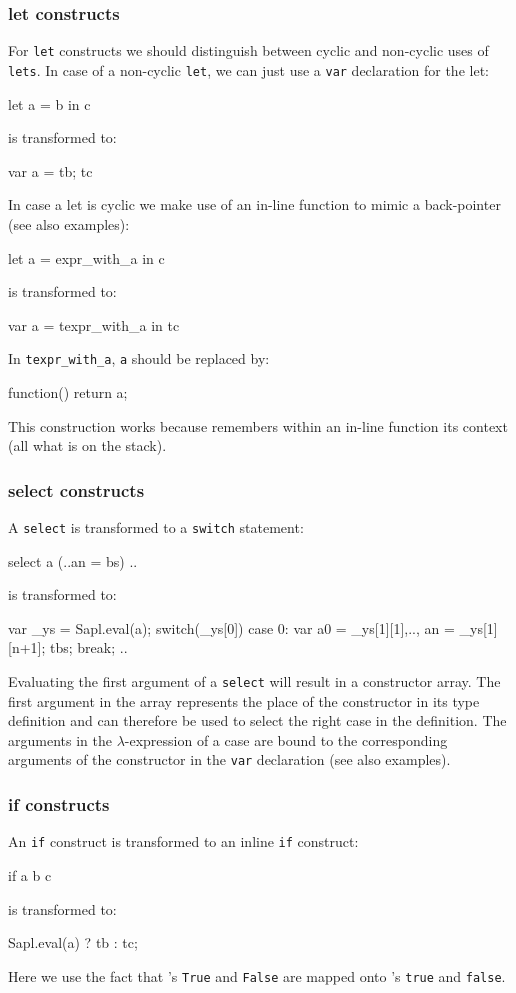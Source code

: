 \subsubsection{\textsf{let} constructs} 
For \texttt{let} constructs we should distinguish between cyclic and non-cyclic uses of \texttt{lets}.
In case of a non-cyclic \texttt{let}, we can just use a \texttt{var} declaration for the let:
\begin{CleanCode}
let a = b in c
\end{CleanCode}
is transformed to:
\begin{CleanCode}
var a = tb; tc
\end{CleanCode}
In case a let is cyclic we make use of an in-line \JS function to mimic a back-pointer (see also examples):
\begin{CleanCode}
let a = expr_with_a in c
\end{CleanCode}
is transformed to:
\begin{CleanCode}
var a = texpr_with_a in tc
\end{CleanCode}
In \texttt{texpr\_with\_a}, \texttt{a} should be replaced by: 
\begin{CleanCode}
function() {return a;}
\end{CleanCode}
This construction works because \JS remembers within an in-line function its context (all what is on the stack).

\subsubsection{\textsf{select} constructs} 
A \texttt{select} is transformed to a \texttt{switch} statement:
\begin{CleanCode}
select a (..an = bs) ..
\end{CleanCode}
is transformed to:
\begin{CleanCode}
var _ys = Sapl.eval(a);
switch(_ys[0]) {
	case 0: var a0 = _ys[1][1],..,  an = _ys[1][n+1];
				  tbs;
		      break;
	..
}
\end{CleanCode}
Evaluating the first argument of a \texttt{select} will result in a constructor array. 
The first argument in the array represents the place of the constructor in its type definition
and can therefore be used to select the right case in the definition.
The arguments in the $\lambda$-expression of a case are bound to the corresponding
arguments of the constructor in the \texttt{var} declaration (see also examples).

\subsubsection{\textsf{if} constructs} 
An \texttt{if} construct is transformed to an inline \JS \texttt{if} construct:
\begin{CleanCode}
if a b c
\end{CleanCode}
is transformed to:
\begin{CleanCode}
Sapl.eval(a) ? tb : tc;
\end{CleanCode}
Here we use the fact that \Sapl's \texttt{True} and \texttt{False} are mapped onto \JS's \texttt{true} and \texttt{false}.

